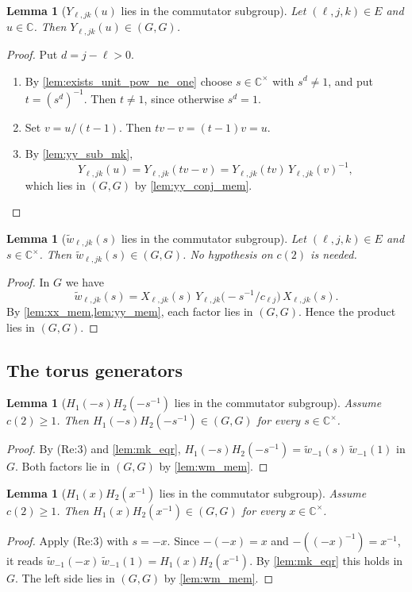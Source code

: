 \documentclass[11pt]{article}
\newtheorem{lemma}[theorem]{Lemma}
\theoremstyle{definition}
\theoremstyle{remark}
\newcommand{\C}{\mathbb{C}}
\newcommand{\Cx}{\mathbb{C}^{\times}}
\newcommand{\wt}{\widetilde{w}}
\newcommand{\comm}{(G,G)}
\begin{document}
\begin{lemma}[$Y_{\ell,jk}(u)$ lies in the commutator subgroup]\label{lem:yy_mem}
Let $(\ell,j,k)\in E$ and $u\in\C$. Then $Y_{\ell,jk}(u)\in\comm$.
\end{lemma}
\begin{proof}
Put $d=j-\ell>0$.
\begin{enumerate}
\item By \cref{lem:exists_unit_pow_ne_one} choose $s\in\Cx$ with $s^d\ne1$, and put $t=(s^d)^{-1}$. Then $t\ne 1$, since otherwise $s^d=1$.
\item Set $v=u/(t-1)$. Then $tv-v=(t-1)v=u$.
\item By \cref{lem:yy_sub_mk},
\[
Y_{\ell,jk}(u)=Y_{\ell,jk}(tv-v)=Y_{\ell,jk}(tv)\,Y_{\ell,jk}(v)^{-1},
\]
which lies in $\comm$ by \cref{lem:yy_conj_mem}. \qedhere
\end{enumerate}
\end{proof}

\begin{lemma}[$\wt_{\ell,jk}(s)$ lies in the commutator subgroup]\label{lem:ww_mem}
Let $(\ell,j,k)\in E$ and $s\in\Cx$. Then $\wt_{\ell,jk}(s)\in\comm$. No hypothesis on $c(2)$ is needed.
\end{lemma}
\begin{proof}
In $G$ we have
\[
\wt_{\ell,jk}(s)=X_{\ell,jk}(s)\,Y_{\ell,jk}\big(-s^{-1}/c_{\ell j}\big)\,X_{\ell,jk}(s).
\]
By \cref{lem:xx_mem,lem:yy_mem}, each factor lies in $\comm$. Hence the product lies in $\comm$.
\end{proof}

\subsection{The torus generators}

\begin{lemma}[$H_1(-s)H_2(-s^{-1})$ lies in the commutator subgroup]\label{lem:h1h2_neg_mem}
Assume $c(2)\ge1$. Then $H_1(-s)H_2(-s^{-1})\in\comm$ for every $s\in\Cx$.
\end{lemma}
\begin{proof}
By (Re:3) and \cref{lem:mk_eqr}, $H_1(-s)H_2(-s^{-1})=\wt_{-1}(s)\,\wt_{-1}(1)$ in $G$. Both factors lie in $\comm$ by \cref{lem:wm_mem}.
\end{proof}

\begin{lemma}[$H_1(x)H_2(x^{-1})$ lies in the commutator subgroup]\label{lem:h1h2_inv_mem}
Assume $c(2)\ge1$. Then $H_1(x)H_2(x^{-1})\in\comm$ for every $x\in\Cx$.
\end{lemma}
\begin{proof}
Apply (Re:3) with $s=-x$. Since $-(-x)=x$ and $-((-x)^{-1})=x^{-1}$, it reads $\wt_{-1}(-x)\,\wt_{-1}(1)=H_1(x)H_2(x^{-1})$. By \cref{lem:mk_eqr} this holds in $G$. The left side lies in $\comm$ by \cref{lem:wm_mem}.
\end{proof}
\end{document}
